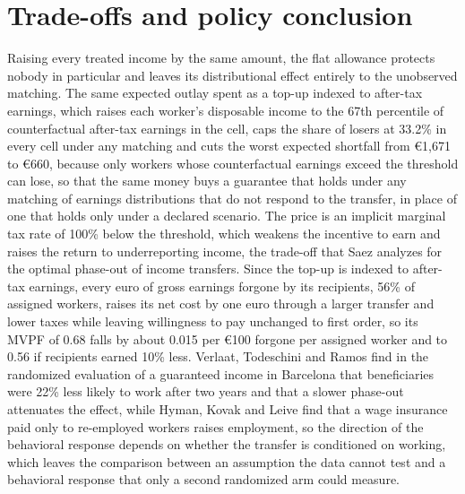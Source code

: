 \documentclass[11pt,a4paper]{article}
\begin{document}
\section{Trade-offs and policy conclusion}
Raising every treated income by the same amount, the flat allowance protects nobody in particular and leaves its distributional effect entirely to the unobserved matching. The same expected outlay spent as a top-up indexed to after-tax earnings, which raises each worker's disposable income to the 67th percentile of counterfactual after-tax earnings in the cell, caps the share of losers at 33.2\% in every cell under any matching and cuts the worst expected shortfall from €1,671 to €660, because only workers whose counterfactual earnings exceed the threshold can lose, so that the same money buys a guarantee that holds under any matching of earnings distributions that do not respond to the transfer, in place of one that holds only under a declared scenario. The price is an implicit marginal tax rate of 100\% below the threshold, which weakens the incentive to earn and raises the return to underreporting income, the trade-off that Saez \cite{saez} analyzes for the optimal phase-out of income transfers. Since the top-up is indexed to after-tax earnings, every euro of gross earnings forgone by its recipients, 56\% of assigned workers, raises its net cost by one euro through a larger transfer and lower taxes while leaving willingness to pay unchanged to first order, so its MVPF of 0.68 falls by about 0.015 per €100 forgone per assigned worker and to 0.56 if recipients earned 10\% less. Verlaat, Todeschini and Ramos \cite{verlaat} find in the randomized evaluation of a guaranteed income in Barcelona that beneficiaries were 22\% less likely to work after two years and that a slower phase-out attenuates the effect, while Hyman, Kovak and Leive \cite{hyman} find that a wage insurance paid only to re-employed workers raises employment, so the direction of the behavioral response depends on whether the transfer is conditioned on working, which leaves the comparison between an assumption the data cannot test and a behavioral response that only a second randomized arm could measure.
\end{document}
